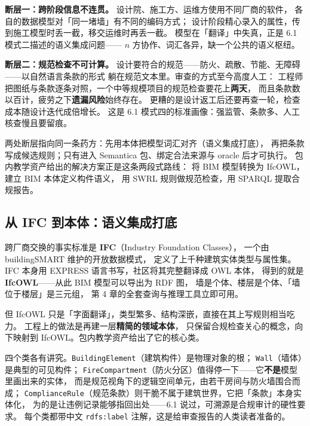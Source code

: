 \textbf{断层一：跨阶段信息不连贯。}
设计院、施工方、运维方使用不同厂商的软件，
各自的数据模型对「同一堵墙」有不同的编码方式；
设计阶段精心录入的属性，传到施工模型时丢一截，移交运维时再丢一截。
模型在「翻译」中失真，正是 6.1 模式二描述的语义集成问题——
\(n\) 方协作、词汇各异，缺一个公共的语义枢纽。

\textbf{断层二：规范检查不可计算。}
设计要符合的规范——防火、疏散、节能、无障碍——以自然语言条款的形式
躺在规范文本里。审查的方式至今高度人工：
工程师把图纸与条款逐条对照，一个中等规模项目的规范检查要花上\textbf{两天}，
而且条款数以百计，疲劳之下\textbf{遗漏风险}始终存在。
更糟的是设计返工后还要再查一轮，检查成本随设计迭代成倍增长。
这是 6.1 模式四的标准画像：强监管、条款多、人工核查慢且要留痕。

两处断层指向同一条药方：先用本体把模型词汇对齐（语义集成打底），
再把条款写成候选规则；只有进入 Semantica 包、绑定合法来源与 oracle 后才可执行。
包内教学资产给出的解决方案正是这条两段式路线：
将 BIM 模型转换为 IfcOWL，建立 BIM 本体定义构件语义，
用 SWRL 规则做规范检查，用 SPARQL 提取合规报告。

\subsection{从 IFC 到本体：语义集成打底}

跨厂商交换的事实标准是 \textbf{IFC}（Industry Foundation Classes），
一个由 buildingSMART 维护的开放数据模式，
定义了上千种建筑实体类型与属性集。
IFC 本身用 EXPRESS 语言书写，社区将其完整翻译成 OWL 本体，
得到的就是 \textbf{IfcOWL}——从此 BIM 模型可以导出为 RDF 图，
墙是个体、楼层是个体、「墙位于楼层」是三元组，
第 4 章的全套查询与推理工具立即可用。

但 IfcOWL 只是「字面翻译」，类型繁多、结构深嵌，直接在其上写规则相当吃力。
工程上的做法是再建一层\textbf{精简的领域本体}，
只保留合规检查关心的概念，向下映射到 IfcOWL。包内教学资产给出了它的核心类。



四个类各有讲究。\texttt{BuildingElement}（建筑构件）是物理对象的根；
\texttt{Wall}（墙体）是典型的可见构件；
\texttt{FireCompartment}（防火分区）值得停一下——它\textbf{不是}模型里画出来的实体，
而是规范视角下的逻辑空间单元，由若干房间与防火墙围合而成；
\texttt{ComplianceRule}（规范条款）则干脆不属于建筑世界，它把「条款」本身实体化，
为的是让违例记录能够指回出处——6.1 说过，可溯源是合规审计的硬性要求。
每个类都带中文 \texttt{rdfs:label} 注解，这是给审查报告的人类读者准备的。

